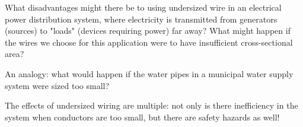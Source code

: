 

What disadvantages might there be to using undersized wire in an electrical power distribution system, where electricity is transmitted from generators (sources) to "loads" (devices requiring power) far away?  What might happen if the wires we choose for this application were to have insufficient cross-sectional area?







An analogy: what would happen if the water pipes in a municipal water supply system were sized too small?







The effects of undersized wiring are multiple: not only is there inefficiency in the system when conductors are too small, but there are safety hazards as well!




